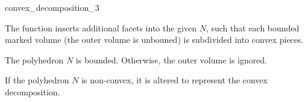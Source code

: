 
\ccHtmlNoClassLinks
\begin{ccRefFunction}{convex_decomposition_3}
\label{refconvex_decomposition_3}

\ccDefinition

The function  inserts additional facets
into the given  $N$, such that each bounded
marked volume (the outer volume is unbouned) is subdivided into convex
pieces.


\ccPrecond

The polyhedron $N$ is bounded. Otherwise, the outer volume is ignored.

\ccPostcond

If the polyhedron $N$ is non-convex, it is altered to represent the
convex decomposition.

\ccSeeAlso
{}\\ 

\end{ccRefFunction}
